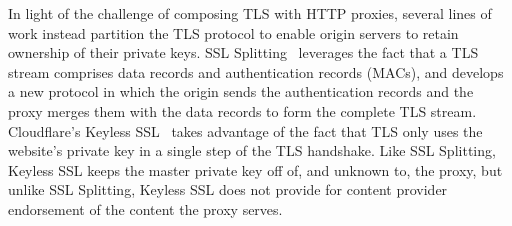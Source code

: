 %
In light of the challenge of composing  TLS with HTTP proxies, several lines of
work instead partition the TLS protocol to enable origin servers to retain
ownership of their private keys.
%
SSL Splitting~\cite{ssl-splitting} leverages the fact that a TLS stream
comprises data records and authentication records (MACs), and develops a new
protocol in which the origin sends the authentication records and the proxy
merges them with the data records to form the complete TLS stream. 
%
Cloudflare’s Keyless SSL~\cite{keyless-ssl} takes advantage of the fact that
TLS only uses the website’s private key in a single step of the TLS handshake.
%
Like SSL Splitting, Keyless SSL keeps the master private key off of, and
unknown to, the proxy, but unlike SSL Splitting, Keyless SSL does not provide
for content provider endorsement of the content the proxy serves.



%



